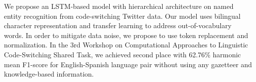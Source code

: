 We propose an LSTM-based model with hierarchical architecture on named entity recognition from code-switching Twitter data. Our model uses bilingual character representation and transfer learning to address out-of-vocabulary words. In order to mitigate data noise, we propose to use token replacement and normalization. In the 3rd Workshop on Computational Approaches to Linguistic Code-Switching Shared Task, we achieved second place with 62.76\% harmonic mean F1-score for English-Spanish language pair without using any gazetteer and knowledge-based information.

